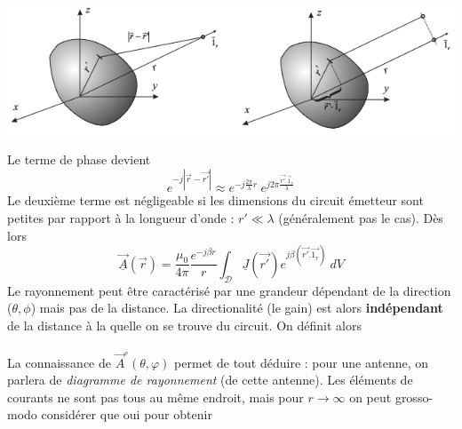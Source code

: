 \begin{center}
	\includegraphics[scale=0.45]{ch4/image2.png}
\end{center}

	Le terme de phase devient
	\begin{equation}
	e^{-j|\vec{r}-\vec{r'}|} \approx e^{-j\frac{2\pi}{\lambda}r}\ e^{j2\pi\frac{\vec{r'}.\vec{1}_r}{
	\lambda}}
	\end{equation}
	Le deuxième terme est négligeable si les dimensions du circuit émetteur sont petites par rapport 
	à la longueur d'onde : $r' \ll \lambda$ (généralement pas le cas). Dès lors
	\begin{equation}
	\underline{\vec{A}}(\vec{r}) = \dfrac{\mu_0}{4\pi}\dfrac{e^{-j\beta r}}{r}\int_\mathcal{D}
	\underline{J}(\vec{r'})e^{j\beta(\vec{r'}.\vec{1_r})}\ dV
	\end{equation}
	Le rayonnement peut être caractérisé par une grandeur dépendant de la direction ($\theta,\phi$) 
	mais pas de la distance. La directionalité (le gain) est alors \textbf{indépendant} de la 
	distance à la quelle on se trouve du circuit. On définit alors\\
	
	\ \\
	
	La connaissance de $\vec{A}^\circ(\theta,\varphi)$ permet de tout déduire : pour une antenne, 
	on parlera de \textit{diagramme de rayonnement} (de cette antenne). Les éléments de courants 
	ne sont pas tous au même endroit, mais pour $r\rightarrow\infty$ on peut grosso-modo considérer 
	que oui pour obtenir\\
	\ 
	
